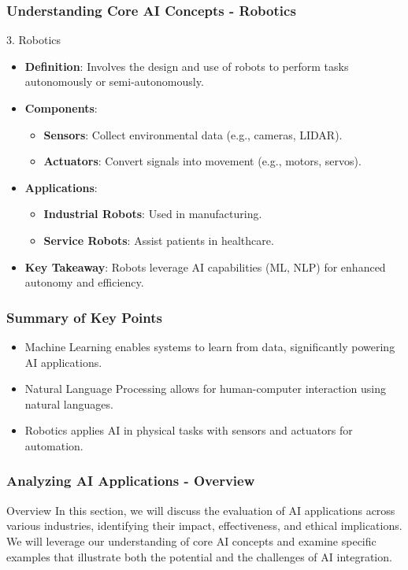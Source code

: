 \documentclass[aspectratio=169]{beamer}
\begin{document}
\begin{frame}[fragile]
    \frametitle{Understanding Core AI Concepts - Robotics}
    \begin{block}{3. Robotics}
        \begin{itemize}
            \item \textbf{Definition}: Involves the design and use of robots to perform tasks autonomously or semi-autonomously.
            \item \textbf{Components}:
            \begin{itemize}
                \item \textbf{Sensors}: Collect environmental data (e.g., cameras, LIDAR).
                \item \textbf{Actuators}: Convert signals into movement (e.g., motors, servos).
            \end{itemize}
            \item \textbf{Applications}:
            \begin{itemize}
                \item \textbf{Industrial Robots}: Used in manufacturing.
                \item \textbf{Service Robots}: Assist patients in healthcare.
            \end{itemize}
            \item \textbf{Key Takeaway}: Robots leverage AI capabilities (ML, NLP) for enhanced autonomy and efficiency.
        \end{itemize}
    \end{block}
\end{frame}

\begin{frame}[fragile]
    \frametitle{Summary of Key Points}
    \begin{itemize}
        \item Machine Learning enables systems to learn from data, significantly powering AI applications.
        \item Natural Language Processing allows for human-computer interaction using natural languages.
        \item Robotics applies AI in physical tasks with sensors and actuators for automation.
    \end{itemize}
\end{frame}

\begin{frame}[fragile]
    \frametitle{Analyzing AI Applications - Overview}
    \begin{block}{Overview}
        In this section, we will discuss the evaluation of AI applications across various industries, identifying their impact, effectiveness, and ethical implications. We will leverage our understanding of core AI concepts and examine specific examples that illustrate both the potential and the challenges of AI integration.
    \end{block}
\end{frame}
\end{document}
